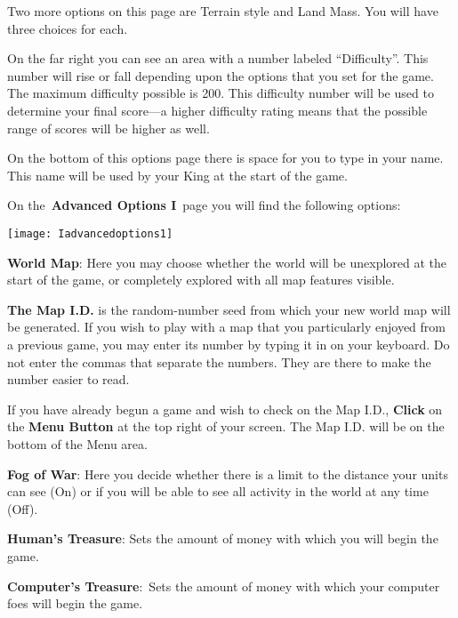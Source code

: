 Two more options on this page are Terrain style and Land Mass. You will have three choices for each.

On the far right you can see an area with a number labeled “Difficulty”. This number will rise or fall depending upon the options that you set for the game. The maximum difficulty possible is 200. This difficulty number will be used to determine your final score---a higher difficulty rating means that the possible range of scores will be higher as well.

On the bottom of this options page there is space for you to type in your name. This name will be used by your King at the start of the game.

On the \textbf{Advanced Options I} page you will find the following options:

\begin{center}
	\texttt{[image: Iadvancedoptions1]}
\end{center}

\textbf{World Map}: Here you may choose whether the world will be unexplored at the start of the game, or completely explored with all map features visible.

\begin{adjustwidth}{1cm}{}
 \textbf{The Map I.D.} is the random-number seed from which your new world map will be generated. If you wish to play with a map that you particularly enjoyed from a previous game, you may enter its number by typing it in on your keyboard. Do not enter the commas that separate the numbers. They are there to make the number easier to read.
\end{adjustwidth}

\begin{adjustwidth}{1cm}{}
 If you have already begun a game and wish to check on the Map I.D., \textbf{Click} on the \textbf{Menu Button} at the top right of your screen. The Map I.D. will be on the bottom of the Menu area.
\end{adjustwidth}

\textbf{Fog of War}: Here you decide whether there is a limit to the distance your units can see (On) or if you will be able to see all activity in the world at any time (Off).

\textbf{Human’s Treasure}: Sets the amount of money with which you will begin the game.

\textbf{Computer’s Treasure}: Sets the amount of money with which your computer foes will begin the game.


